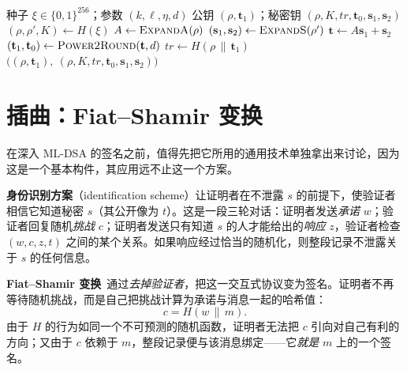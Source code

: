 \begin{algorithm}[H]
\caption{ML-DSA.KeyGen（教学形式）}
\label{alg:mldsa-keygen}
\begin{algorithmic}[1]
\Require 种子 $\xi \in \{0,1\}^{256}$；参数 $(k,\ell,\eta,d)$
\Ensure 公钥 $(\rho,\mathbf{t}_1)$；秘密钥 $(\rho,K,tr,\mathbf{t}_0,\mathbf{s}_1,\mathbf{s}_2)$
\State $(\rho,\rho',K) \gets H(\xi)$ 
\State $A \gets \textsc{ExpandA}(\rho)$ 
\State $(\mathbf{s}_1,\mathbf{s}_2) \gets \textsc{ExpandS}(\rho')$ 
\State $\mathbf{t} \gets A\mathbf{s}_1 + \mathbf{s}_2$ 
\State $(\mathbf{t}_1,\mathbf{t}_0) \gets \textsc{Power2Round}(\mathbf{t}, d)$
\State $tr \gets H(\rho\,\|\,\mathbf{t}_1)$
\State \Return $\big((\rho,\mathbf{t}_1),\ (\rho,K,tr,\mathbf{t}_0,\mathbf{s}_1,\mathbf{s}_2)\big)$
\end{algorithmic}
\end{algorithm}

\section{插曲：Fiat--Shamir 变换}
\label{sec:fiat-shamir}

在深入 ML-DSA 的签名之前，值得先把它所用的通用技术单独拿出来讨论，因为这是一个基本构件，其应用远不止这一个方案。

\textbf{身份识别方案}（identification scheme）让证明者在不泄露 $s$ 的前提下，使验证者相信它知道秘密 $s$（其公开像为 $t$）。这是一段三轮对话：证明者发送\emph{承诺} $w$；验证者回复随机\emph{挑战} $c$；证明者发送只有知道 $s$ 的人才能给出的\emph{响应} $z$，验证者检查 $(w,c,z,t)$ 之间的某个关系。如果响应经过恰当的随机化，则整段记录不泄露关于 $s$ 的任何信息。

\textbf{Fiat--Shamir 变换}~\cite{fiatshamir1986}通过\emph{去掉验证者}，把这一交互式协议变为签名。证明者不再等待随机挑战，而是自己把挑战计算为承诺与消息一起的哈希值：
\[
c = H(w \,\|\, m).
\]
由于 $H$ 的行为如同一个不可预测的随机函数，证明者无法把 $c$ 引向对自己有利的方向；又由于 $c$ 依赖于 $m$，整段记录便与该消息绑定——它\emph{就是} $m$ 上的一个签名。

